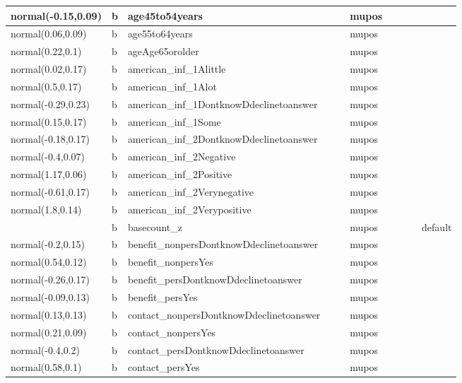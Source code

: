 \documentclass[
]{book}
\theoremstyle{definition}
\theoremstyle{definition}
\theoremstyle{definition}
\theoremstyle{definition}
\theoremstyle{remark}
\begin{document}
\begin{table}
\begin{tabular}[t]{l|l|l|l|l|l|l|l|l|l}
\hline
normal(-0.15,0.09) & b & age45to54years &  &  & mupos &  &  &  & \\
\hline
normal(0.06,0.09) & b & age55to64years &  &  & mupos &  &  &  & \\
\hline
normal(0.22,0.1) & b & ageAge65orolder &  &  & mupos &  &  &  & \\
\hline
normal(0.02,0.17) & b & american\_inf\_1Alittle &  &  & mupos &  &  &  & \\
\hline
normal(0.5,0.17) & b & american\_inf\_1Alot &  &  & mupos &  &  &  & \\
\hline
normal(-0.29,0.23) & b & american\_inf\_1DontknowDdeclinetoanswer &  &  & mupos &  &  &  & \\
\hline
normal(0.15,0.17) & b & american\_inf\_1Some &  &  & mupos &  &  &  & \\
\hline
normal(-0.18,0.17) & b & american\_inf\_2DontknowDdeclinetoanswer &  &  & mupos &  &  &  & \\
\hline
normal(-0.4,0.07) & b & american\_inf\_2Negative &  &  & mupos &  &  &  & \\
\hline
normal(1.17,0.06) & b & american\_inf\_2Positive &  &  & mupos &  &  &  & \\
\hline
normal(-0.61,0.17) & b & american\_inf\_2Verynegative &  &  & mupos &  &  &  & \\
\hline
normal(1.8,0.14) & b & american\_inf\_2Verypositive &  &  & mupos &  &  &  & \\
\hline
 & b & basecount\_z &  &  & mupos &  &  &  & default\\
\hline
normal(-0.2,0.15) & b & benefit\_nonpersDontknowDdeclinetoanswer &  &  & mupos &  &  &  & \\
\hline
normal(0.54,0.12) & b & benefit\_nonpersYes &  &  & mupos &  &  &  & \\
\hline
normal(-0.26,0.17) & b & benefit\_persDontknowDdeclinetoanswer &  &  & mupos &  &  &  & \\
\hline
normal(-0.09,0.13) & b & benefit\_persYes &  &  & mupos &  &  &  & \\
\hline
normal(0.13,0.13) & b & contact\_nonpersDontknowDdeclinetoanswer &  &  & mupos &  &  &  & \\
\hline
normal(0.21,0.09) & b & contact\_nonpersYes &  &  & mupos &  &  &  & \\
\hline
normal(-0.4,0.2) & b & contact\_persDontknowDdeclinetoanswer &  &  & mupos &  &  &  & \\
\hline
normal(0.58,0.1) & b & contact\_persYes &  &  & mupos &  &  &  & \\

\end{tabular}
\end{table}
\end{document}
